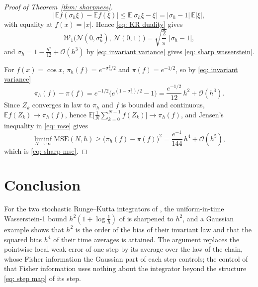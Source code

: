 \documentclass[namedate,webpdf,imanum]{ima-authoring-template}
\newcommand{\Le}{\leqslant}
\newcommand{\Ge}{\geqslant}
\theoremstyle{thmstyletwo}
\numberwithin{equation}{section}
\begin{document}
\begin{proof}[Proof of Theorem~\ref{thm: sharpness}]
    \begin{equation*}
        \bigl| \mathbb E f(\sigma_h \xi) - \mathbb E f(\xi) \bigr| \Le \mathbb E \bigl| \sigma_h \xi - \xi \bigr| = | \sigma_h - 1 |\, \mathbb E | \xi | ,
    \end{equation*}
    with equality at $f(x) = |x|$. Hence \eqref{eq: KR duality} gives
    \begin{equation*}
        \mathcal W_1\bigl( \mathcal N(0, \sigma_h^2) ,\, \mathcal N(0, 1) \bigr) = \sqrt{\frac2\pi}\; | \sigma_h - 1 | ,
    \end{equation*}
    and $\sigma_h = 1 - \frac{h^2}{12} + \mathcal O(h^3)$ by \eqref{eq: invariant variance} gives \eqref{eq: sharp wasserstein}.

    For $f(x) = \cos x$, $\pi_h(f) = e^{-\sigma_h^2/2}$ and $\pi(f) = e^{-1/2}$, so by \eqref{eq: invariant variance}
    \begin{equation*}
        \pi_h(f) - \pi(f) = e^{-1/2} \bigl( e^{(1 - \sigma_h^2)/2} - 1 \bigr) = \frac{e^{-1/2}}{12}\, h^2 + \mathcal O(h^3) .
    \end{equation*}
    Since $Z_k$ converges in law to $\pi_h$ and $f$ is bounded and continuous, $\mathbb E f(Z_k) \to \pi_h(f)$, hence $\mathbb E \bigl[ \frac1N \sum_{k=0}^{N-1} f(Z_k) \bigr] \to \pi_h(f)$, and Jensen's inequality in \eqref{eq: mse} gives
    \begin{equation*}
        \liminf_{N \to \infty} \mathrm{MSE}(N, h) \Ge \bigl( \pi_h(f) - \pi(f) \bigr)^2 = \frac{e^{-1}}{144}\, h^4 + \mathcal O(h^5) ,
    \end{equation*}
    which is \eqref{eq: sharp mse}.
\end{proof}

\section{Conclusion}
\label{sec: conclusion}

For the two stochastic Runge--Kutta integrators of \citet{yang2026accelerating}, the uniform-in-time Wasserstein-1 bound $h^2 ( 1 + \log\frac1h )$ of \citet{ye2026mse} is sharpened to $h^2$, and a Gaussian example shows that $h^2$ is the order of the bias of their invariant law and that the squared bias $h^4$ of their time averages is attained. The argument replaces the pointwise local weak error of one step by its average over the law of the chain, whose Fisher information the Gaussian part of each step controls; the control of that Fisher information uses nothing about the integrator beyond the structure \eqref{eq: step map} of its step.



\end{document}
